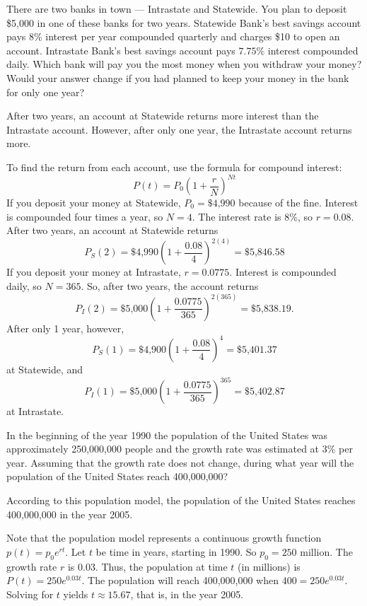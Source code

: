 \documentclass{ximera}
\begin{document}
\begin{exercise} \label{c3.1.9}
There are two banks in town --- Intrastate and Statewide.  You plan
to deposit \$5,000 in one of these banks for two years.  Statewide Bank's
best savings account pays $8\%$ interest per year compounded quarterly
and charges \$10 to open an account.  Intrastate Bank's best savings
account pays $7.75\%$ interest compounded daily.  Which bank will
pay you the most money when you withdraw your money?  Would your
answer change if you had planned to keep your money in the bank
for only one year?

\begin{solution}

\ans After two years, an account at Statewide returns more interest than
the Intrastate account.  However, after only one year, the Intrastate
account returns more.

\soln To find the return from each account, use the formula for
compound interest:
\[
P(t) = P_0\left(1 + \frac{r}{N}\right)^{Nt}
\]
If you deposit your money at Statewide, $P_0 = \$4\mbox{,}990$ because of the
fine.  Interest is compounded four times a year, so $N = 4$.  The interest
rate is 8\%, so $r = 0.08$.
After two years, an account at Statewide returns
\[
P_{S}(2) = \$4\mbox{,}990\left(1 + \frac{0.08}{4}\right)^{2(4)} = 
\$5\mbox{,}846.58
\]
If you deposit your money at Intrastate, $r = 0.0775$.  Interest is
compounded daily, so $N = 365$.  So, after two years, the account returns
\[
P_{I}(2) = \$5\mbox{,}000\left(1 + \frac{0.0775}{365}\right)^{2(365)} = 
\$5\mbox{,}838.19.
\]
After only 1 year, however,
\[
P_{S}(1) = \$4\mbox{,}900\left(1 + \frac{0.08}{4}\right)^{4} = \$5\mbox{,}401.37
\]
at Statewide, and
\[
P_{I}(1) = \$5\mbox{,}000\left(1 + \frac{0.0775}{365}\right)^{365} = 
\$5\mbox{,}402.87
\]
at Intrastate.

\end{solution}
\end{exercise}

\begin{exercise} \label{c3.1.10}
In the beginning of the year 1990 the population of the United States was
approximately 250,000,000 people and the growth rate was estimated at $3\%$
per year.  Assuming that the growth rate does not change, during what year
will the population of the United States reach 400,000,000?

\begin{solution}

\ans According to this population model, the population of the United States
reaches 400,000,000 in the year 2005.

\soln Note that the population model represents a continuous growth
function $p(t) = p_0e^{rt}$.  Let $t$ be time in years, starting in 1990. 
So $p_0 = 250$ million.  The growth rate $r$ is $0.03$.  Thus, the
population at time $t$ (in millions) is $P(t) = 250e^{0.03t}$.
The population will reach 400,000,000 when $400 = 250e^{0.03t}$.
Solving for $t$ yields $t \approx 15.67$, that is, in the year 2005.



\end{solution}
\end{exercise}
\end{document}
